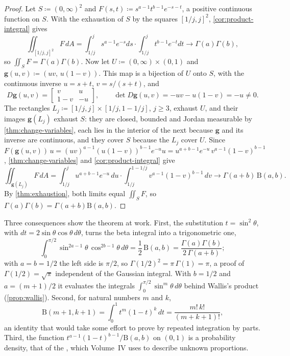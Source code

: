 \begin{proof}
Let $S\coloneqq(0,\infty)^2$ and $F(s,t)\coloneqq s^{a-1}t^{b-1}e^{-s-t}$, a positive continuous function on $S$. With the exhaustion of $S$ by the squares $[1/j,j]^2$, \cref{cor:product-integral} gives
\[
\iint_{[1/j,j]^2}F\,dA=\int_{1/j}^js^{a-1}e^{-s}ds\cdot\int_{1/j}^jt^{b-1}e^{-t}dt\to\Gamma(a)\Gamma(b),
\]
so $\iint_SF=\Gamma(a)\Gamma(b)$. Now let $U\coloneqq(0,\infty)\times(0,1)$ and $\mathbf g(u,v)\coloneqq(uv,\,u(1-v))$. This map is a bijection of $U$ onto $S$, with the continuous inverse $u=s+t$, $v=s/(s+t)$, and
\[
D\mathbf g(u,v)=\begin{bmatrix}v&u\\1-v&-u\end{bmatrix},\qquad\det D\mathbf g(u,v)=-uv-u(1-v)=-u\ne0 .
\]
The rectangles $L_j\coloneqq[1/j,j]\times[1/j,1-1/j]$, $j\ge3$, exhaust $U$, and their images $\mathbf g(L_j)$ exhaust $S$: they are closed, bounded and Jordan measurable by \cref{thm:change-variables}, each lies in the interior of the next because $\mathbf g$ and its inverse are continuous, and they cover $S$ because the $L_j$ cover $U$. Since $F(\mathbf g(u,v))\,u=(uv)^{a-1}(u(1-v))^{b-1}e^{-u}u=u^{a+b-1}e^{-u}\,v^{a-1}(1-v)^{b-1}$, \cref{thm:change-variables} and \cref{cor:product-integral} give
\[
\iint_{\mathbf g(L_j)}F\,dA=\int_{1/j}^ju^{a+b-1}e^{-u}\,du\cdot\int_{1/j}^{1-1/j}v^{a-1}(1-v)^{b-1}\,dv\to\Gamma(a+b)\,\mathrm B(a,b).
\]
By \cref{thm:exhaustion}, both limits equal $\iint_SF$, so $\Gamma(a)\Gamma(b)=\Gamma(a+b)\mathrm B(a,b)$.
\end{proof}

Three consequences show the theorem at work. First, the substitution $t=\sin^2\theta$, with $dt=2\sin\theta\cos\theta\,d\theta$, turns the beta integral into a trigonometric one,
\[
\int_0^{\pi/2}\sin^{2a-1}\theta\,\cos^{2b-1}\theta\,d\theta=\frac12\,\mathrm B(a,b)=\frac{\Gamma(a)\Gamma(b)}{2\,\Gamma(a+b)} ;
\]
with $a=b=1/2$ the left side is $\pi/2$, so $\Gamma(1/2)^2=\pi\,\Gamma(1)=\pi$, a proof of $\Gamma(1/2)=\sqrt\pi$ independent of the Gaussian integral. With $b=1/2$ and $a=(m+1)/2$ it evaluates the integrals $\int_0^{\pi/2}\sin^m\theta\,d\theta$ behind Wallis's product (\cref{prop:wallis}). Second, for natural numbers $m$ and $k$,
\[
\mathrm B(m+1,k+1)=\int_0^1t^m(1-t)^k\,dt=\frac{m!\,k!}{(m+k+1)!},
\]
an identity that would take some effort to prove by repeated integration by parts. Third, the function $t^{a-1}(1-t)^{b-1}/\mathrm B(a,b)$ on $(0,1)$ is a probability density, that of the , which Volume~IV uses to describe unknown proportions.

